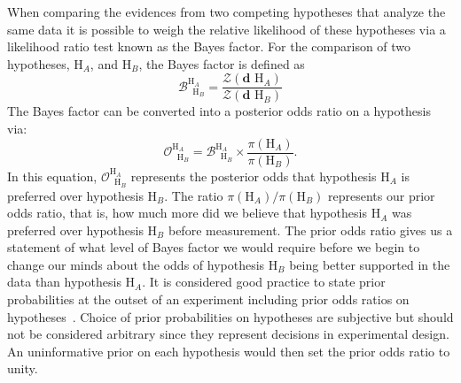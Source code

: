 When comparing the evidences from two competing hypotheses that analyze the same data it is possible to weigh the relative likelihood of these hypotheses via a likelihood ratio test known as the Bayes factor. For the comparison of two hypotheses, $\mathrm{H}_A$, and $\mathrm{H}_B$, the Bayes factor is defined as
\begin{equation}
    \mathcal{B}^{\mathrm{H}_A\;\;}_{\;\;\mathrm{H}_B} = \frac{\mathcal{Z}(\mathbf{d} \, \, \mathrm{H}_A)}{\mathcal{Z}(\mathbf{d} \, \, \mathrm{H}_B)}
\end{equation}
The Bayes factor can be converted into a posterior odds ratio on a hypothesis via:
\begin{equation}\label{eqn:odds_ratio}
    \mathcal{O}^{\mathrm{H}_A\;\;}_{\;\;\mathrm{H}_B} = \mathcal{B}^{\mathrm{H}_A\;\;}_{\;\;\mathrm{H}_B} \times \frac{\pi(\mathrm{H}_A)}{\pi(\mathrm{H}_B)}.
\end{equation}
In this equation, $\mathcal{O}^{\mathrm{H}_A\;\;}_{\;\;\mathrm{H}_B}$ represents the posterior odds that hypothesis $\mathrm{H}_A$ is preferred over hypothesis $\mathrm{H}_B$. The ratio $\pi(\mathrm{H}_A) / \pi(\mathrm{H}_B)$ represents our prior odds ratio, that is, how much more did we believe that hypothesis $\mathrm{H}_A$  was preferred over hypothesis $\mathrm{H}_B$  before measurement. The prior odds ratio gives us a statement of what level of Bayes factor we would require before we begin to change our minds about the odds of hypothesis $\mathrm{H}_B$ being better supported in the data than hypothesis $\mathrm{H}_A$. It is considered good practice to state prior probabilities at the outset of an experiment including prior odds ratios on hypotheses~\cite{hobson2010bayesian}. Choice of prior probabilities on hypotheses are subjective but should not be considered arbitrary since they represent decisions in experimental design. An uninformative prior on each hypothesis would then set the prior odds ratio to unity.

